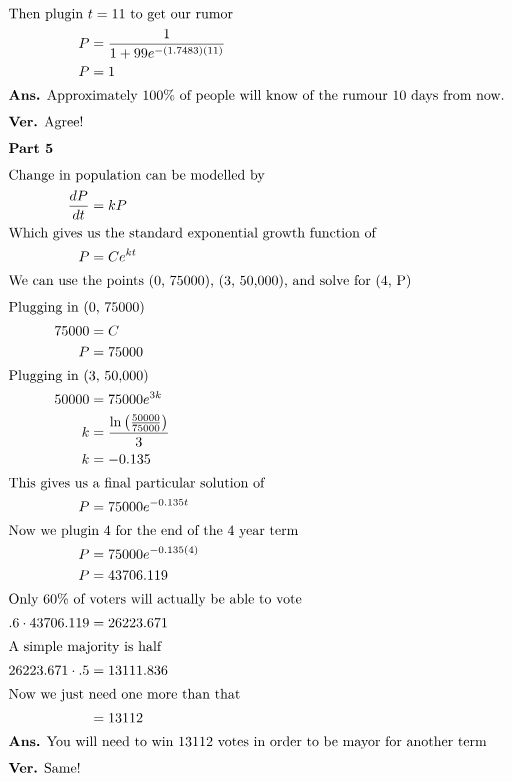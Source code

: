 \documentclass[12pt]{article}
\begin{document}
\begin{align}
  \intertext{Then plugin $t=11$ to get our rumor}
  P                                           & =\frac{1}{1+99e^{-\left(1.7483\right)\left(11\right)}}     \\
  P                                           & =1                                                         \\
  \intertext{\textbf{Ans.} Approximately 100\% of people will know of the rumour 10 days from now.}
  \intertext{\textbf{Ver.} Agree!}
  \intertext{\textbf{Part 5}}
  \intertext{Change in population can be modelled by }
  \frac{dP}{dt}                               & =kP                                                        \\
  \intertext{Which gives us the standard exponential growth function of}
  P                                           & =Ce^{kt}                                                   \\
  \intertext{We can use the points (0, 75000), (3, 50,000), and solve for (4, P)}
  \intertext{Plugging in (0, 75000)}
  75000                                       & =C                                                         \\
  P                                           & =75000                                                     \\
  \intertext{Plugging in (3, 50,000)}
  50000                                       & =75000e^{3k}                                               \\
  k                                           & =\frac{\ln\left(\frac{50000}{75000}\right)}{3}             \\
  k                                           & =-0.135                                                    \\
  \intertext{This gives us a final particular solution of}
  P                                           & =75000e^{-0.135t}                                          \\
  \intertext{Now we plugin 4 for the end of the 4 year term}
  P                                           & =75000e^{-0.135\left(4\right)}                             \\
  P                                           & =43706.119                                                 \\
  \intertext{Only 60\% of voters will actually be able to vote }
  .6\cdot43706.119                            & =26223.671                                                 \\
  \intertext{A simple majority is half}
  26223.671\cdot.5                            & =13111.836                                                 \\
  \intertext{Now we just need one more than that}
                                              & =13112                                                     \\
  \intertext{\textbf{Ans.} You will need to win 13112 votes in order to be mayor for another term}
  \intertext{\textbf{Ver.} Same!}
\end{align}
\end{document}
